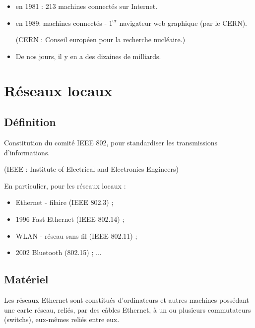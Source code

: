 \begin{itemize}
	\item en 1981 : 213 machines connectés sur Internet.
	\item en 1989:  machines connectés - $1^{\text{er}}$ navigateur web graphique (par le CERN).

(CERN : Conseil européen pour la recherche nucléaire.)
	\item De nos jours, il y en a des dizaines de milliards.
\end{itemize}

\section{Réseaux locaux}

\subsection{Définition}


\noindent\date{02/1980} Constitution du comité IEEE  802, pour standardiser les transmissions d'informations.

(IEEE : Institute of Electrical and Electronics Engineers)

En particulier, pour les réseaux locaux :
\begin{multicols}{2}
\begin{itemize}
	\item Ethernet - filaire (IEEE 802.3) ;
	\item 1996 Fast Ethernet (IEEE 802.14) ;
	\item WLAN - réseau sans fil (IEEE 802.11) ;
	\item 2002 Bluetooth (802.15) ; ...
\end{itemize}
\end{multicols}

\subsection{Matériel}

Les réseaux Ethernet sont constitués d'ordinateurs et autres machines possédant une carte réseau, reliés, par des câbles Ethernet, à un ou plusieurs commutateurs (switchs), eux-mêmes reliés entre eux.

